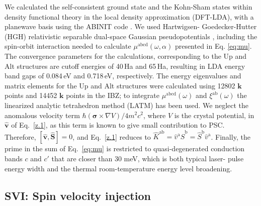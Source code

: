 \documentclass[floatfix,prb,aps,superscriptaddress,showpacs,11pt,preprint,letterpaper]{revtex4}
\begin{document}
We calculated the self-consistent ground state and the Kohn-Sham states within
density functional theory in the local density approximation (DFT-LDA), with a
planewave basis using the ABINIT code \cite{gonzeCPC09}. We used Hartwigsen-
Goedecker-Hutter (HGH) relativistic separable dual-space Gaussian
pseudopotentials \cite{hartwigsenPRB98}, including the spin-orbit interaction
needed to calculate $\mu^{\mathrm{abcd}}(\omega,\alpha)$ presented in Eq.
\eqref{eq:mu}.
The convergence parameters for the calculations,  corresponding to the Up and
Alt structures are cutoff energies of 40\,Ha and 65\,Ha, resulting in LDA
energy band gaps of 0.084\,eV and 0.718\,eV, respectively. The energy
eigenvalues and matrix elements for the Up and Alt structures were calculated
using 12802 ${\mathbf k}$ points and 14452 ${\mathbf k}$ points in the IBZ; to
integrate $\mu^{\mathrm{abcd}}(\omega)$ and
$\xi^{\mathrm{a}\mathrm{b}}(\omega)$ the linearized analytic tetrahedron method
(LATM) has been used.\cite{nastosPRB07} We neglect the anomalous velocity term
$\hbar(\boldsymbol{\sigma}\times\nabla V)/4m^2c^2$, where $V$ is the crystal
potential, in $\hat{\mathbf v}$ of Eq.~\eqref{z.1}, as this term is known to
give small contribution to PSC.\cite{bhatPRL05} Therefore, $[\hat{\mathbf
v},\hat{\mathbf S}]=0$, and Eq.~\eqref{z.1} reduces to $\hat
K^{\mathrm{a}\mathrm{b}}=\hat v^\mathrm{a} \hat S^\mathrm{b}=\hat S^\mathrm{b}
\hat v^\mathrm{a}$. Finally, the prime in the sum of Eq.~\eqref{eq:mu} is
restricted to quasi-degenerated conduction bands $c$ and $c'$ that are closer
than 30 meV, which  is both typical laser- pulse energy width and the thermal
room-temperature energy level broadening.\cite{nastosPRB07}

\subsection{SVI: Spin velocity injection}
\label{sec:res-spin_velocity}
\end{document}
